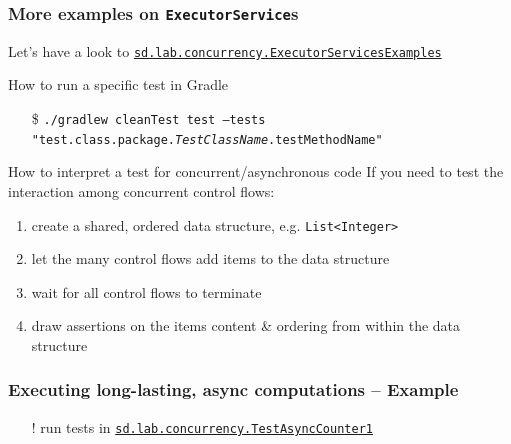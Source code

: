 \documentclass{beamer}\mode<presentation>{\usetheme{AMSCesenaPurpleAndGold}}
\begin{document}
\begin{frame}%
\frametitle{More examples on \texttt{ExecutorService}s}

Let's have a look to \href{https://gitlab.com/pika-lab/courses/ds/aa1920/lab-03/blob/master/src/test/java/sd/lab/concurrency/ExecutorServicesExamples.java}{\texttt{sd.lab.concurrency.\alert{ExecutorServicesExamples}}}

\vfill

\begin{block}{How to run a specific test in Gradle}
	\begin{itemize}
		\item[\$] \texttt{./gradlew cleanTest test --tests "test.class.package.\textit{TestClassName}.\alert{testMethodName}"}
	\end{itemize}
\end{block}

\vfill

\begin{block}{How to interpret a test for concurrent/asynchronous code}
	If you need to test the interaction among \alert{concurrent} control flows:
	\begin{enumerate}
		\item create a shared, ordered data structure, e.g. \texttt{List<\alert{Integer}>}
		
		\item let the many control flows add items to the data structure
		
		\item wait for all control flows to terminate
		
		\item draw assertions on the items content \& ordering from within the data structure
	\end{enumerate}
\end{block}

\end{frame}

\begin{frame}%
\frametitle{Executing long-lasting, async computations -- Example}



\begin{itemize}
	\item[!] run tests in \href{https://gitlab.com/pika-lab/courses/ds/aa1920/lab-03/blob/master/src/test/java/sd/lab/concurrency/TestAsyncCounter1.java}{\texttt{sd.lab.concurrency.\alert{TestAsyncCounter1}}}
\end{itemize}

\end{frame}
\end{document}
